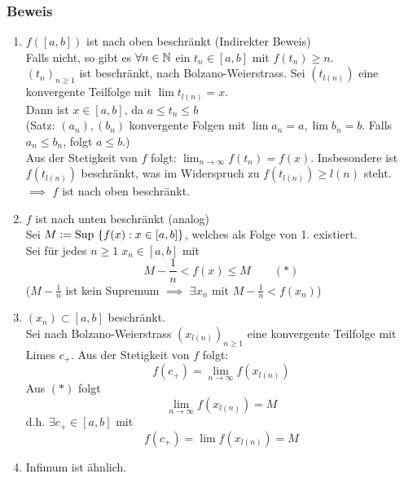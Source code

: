 \subsubsection*{Beweis}
\begin{enumerate}
\item $f([a,b])$ ist nach oben beschränkt (Indirekter Beweis) \\

Falls nicht, so gibt es $\forall n \in \mathbb{N}$ ein $t_{n}\in [a,b]$ mit $f(t_{n}) \geq n$. \\
$(t_{n})_{n\geq 1}$ ist beschränkt, nach Bolzano-Weierstrass. Sei $(t_{l(n)})$ eine konvergente Teilfolge mit $\lim{t_{l(n)}}=x$. \\
Dann ist $x\in [a,b]$, da $a\leq t_{n}\leq b$ \\
(Satz: $(a_{n}), (b_{n})$ konvergente Folgen mit $\lim{a_{n}} = a, \lim{b_{n}} = b$. Falls $a_{n} \leq b_{n}$, folgt $a \leq b$.) \\
Aus der Stetigkeit von $f$ folgt: $\lim_{n\to\infty}{f(t_{n})} = f(x)$. Insbesondere ist $f(t_{l(n)})$ beschränkt, was im Widerspruch zu $f(t_{l(n)})\geq l(n)$ steht. \\

$\implies$ $f$ ist nach oben beschränkt.

\item $f$ ist nach unten beschränkt (analog) \\

Sei $M \vcentcolon= \text{Sup }\{f(x):x\in [a,b]\}$, welches als Folge von 1. existiert. \\
Sei für jedes $n\geq 1\; x_{n}\in [a,b]$ mit \[M-\frac{1}{n} < f(x) \leq M \quad\quad (\ast)\]
($M-\frac{1}{n}$ ist kein Supremum $\implies$ $\exists x_{n}$ mit $M-\frac{1}{n} < f(x_{n})$)\\
\item $(x_{n}) \subset [a,b]$ beschränkt. \\
Sei nach Bolzano-Weierstrass $(x_{l(n)})_{n\geq 1}$ eine konvergente Teilfolge mit Limes $c_{+}$. Aus der Stetigkeit von $f$ folgt: \[ f(c_{+}) = \lim_{n\to\infty}{f(x_{l(n)})}\]
Aus $(\ast)$ folgt
\[ \lim_{n\to\infty}{f(x_{l(n)})} = M\]
d.h. $\exists c_{+} \in [a,b]$ mit \[ f(c_{+}) = \lim{f(x_{l(n)})} = M\]
\item Infimum ist ähnlich.
\end{enumerate}

